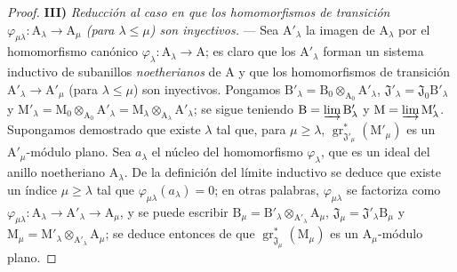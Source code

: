 \begin{proof}
\medskip
\noindent\textbf{III)} \emph{Reducción al caso en que los homomorfismos de transición $\varphi_{\mu\lambda}:\mathrm{A}_\lambda\to\mathrm{A}_\mu$ (para $\lambda\leqslant\mu$) son inyectivos.} --- Sea $\mathrm{A}'_\lambda$ la imagen de $\mathrm{A}_\lambda$ por el homomorfismo canónico $\varphi_\lambda:\mathrm{A}_\lambda\to\mathrm{A}$; es claro que los $\mathrm{A}'_\lambda$ forman un sistema inductivo de subanillos \emph{noetherianos} de $\mathrm{A}$ y que los homomorfismos de transición $\mathrm{A}'_\lambda\to\mathrm{A}'_\mu$ (para $\lambda\leqslant\mu$) son inyectivos. Pongamos $\mathrm{B}'_\lambda=\mathrm{B}_0\otimes_{\mathrm{A}_0}\mathrm{A}'_\lambda$, $\mathfrak{J}'_\lambda=\mathfrak{J}_0\mathrm{B}'_\lambda$ y $\mathrm{M}'_\lambda=\mathrm{M}_0\otimes_{\mathrm{A}_0}\mathrm{A}'_\lambda=\mathrm{M}_\lambda\otimes_{\mathrm{A}_\lambda}\mathrm{A}'_\lambda$; se sigue teniendo $\mathrm{B}=\varinjlim\mathrm{B}'_\lambda$ y $\mathrm{M}=\varinjlim\mathrm{M}'_\lambda$. Supongamos demostrado que existe $\lambda$ tal que, para $\mu\geqslant\lambda$, $\operatorname{gr}^*_{\mathfrak{J}'_\mu}(\mathrm{M}'_\mu)$ es un $\mathrm{A}'_\mu$-módulo plano. Sea $a_\lambda$ el núcleo del homomorfismo $\varphi_\lambda$, que es un ideal del anillo noetheriano $\mathrm{A}_\lambda$. De la definición del límite inductivo se deduce que existe un índice $\mu\geqslant\lambda$ tal que $\varphi_{\mu\lambda}(a_\lambda)=0$; en otras palabras, $\varphi_{\mu\lambda}$ se factoriza como $\varphi_{\mu\lambda}:\mathrm{A}_\lambda\to\mathrm{A}'_\lambda\to\mathrm{A}_\mu$, y se puede escribir $\mathrm{B}_\mu=\mathrm{B}'_\lambda\otimes_{\mathrm{A}'_\lambda}\mathrm{A}_\mu$, $\mathfrak{J}_\mu=\mathfrak{J}'_\lambda\mathrm{B}_\mu$ y $\mathrm{M}_\mu=\mathrm{M}'_\lambda\otimes_{\mathrm{A}'_\lambda}\mathrm{A}_\mu$; se deduce entonces de  que $\operatorname{gr}^*_{\mathfrak{J}_\mu}(\mathrm{M}_\mu)$ es un $\mathrm{A}_\mu$-módulo plano.


\end{proof}
